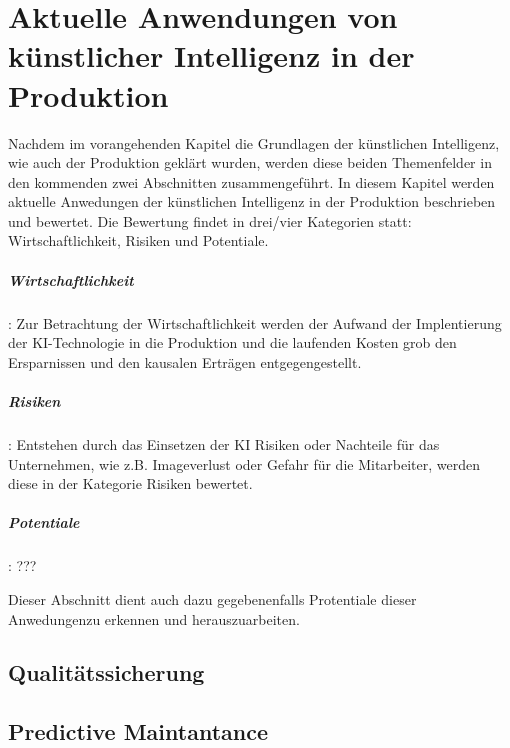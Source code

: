 \documentclass[a4paper,12pt, german]{report}
\begin{document}
\chapter{Aktuelle Anwendungen von künstlicher Intelligenz in der Produktion}

Nachdem im vorangehenden Kapitel die Grundlagen der künstlichen Intelligenz, wie auch der Produktion geklärt wurden, werden diese beiden Themenfelder in den kommenden zwei Abschnitten zusammengeführt. In diesem Kapitel werden aktuelle Anwedungen der künstlichen Intelligenz in der Produktion beschrieben und bewertet. Die Bewertung findet in drei/vier Kategorien statt: Wirtschaftlichkeit, Risiken und Potentiale.

\paragraph{Wirtschaftlichkeit}:  Zur Betrachtung der Wirtschaftlichkeit werden der Aufwand der Implentierung der KI-Technologie in die Produktion und die laufenden Kosten grob den Ersparnissen und den kausalen Erträgen entgegengestellt. 
\paragraph{Risiken}: Entstehen durch das Einsetzen der KI Risiken oder Nachteile für das Unternehmen, wie z.B. Imageverlust oder Gefahr für die Mitarbeiter, werden diese in der Kategorie Risiken bewertet.
\paragraph{Potentiale}: ??? 

Dieser Abschnitt dient auch dazu gegebenenfalls Protentiale dieser Anwedungenzu erkennen und herauszuarbeiten.






\section{Qualitätssicherung}

\section{Predictive Maintantance}
\end{document}
